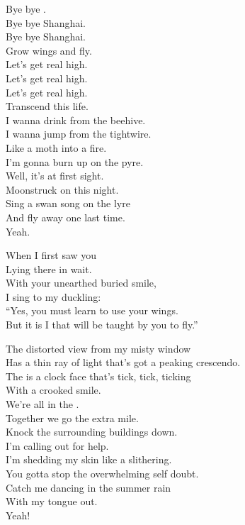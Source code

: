 



Bye bye . \\
Bye bye Shanghai. \\
Bye bye Shanghai. \\
Grow wings and fly. \\
Let's get real high. \\
Let's get real high. \\
Let's get real high. \\
Transcend this life. \\

I wanna drink from the beehive. \\
I wanna jump from the tightwire. \\
Like a moth into a fire. \\
I'm gonna burn up on the pyre. \\
Well, it's  at first sight. \\
Moonstruck on this night. \\
Sing a swan song on the lyre \\
And fly away one last time. \\
Yeah. \\


When I first saw you \\
Lying there in wait. \\
With your unearthed buried smile, \\
I sing to my duckling: \\
``Yes, you must learn to use your wings. \\
But it is I that will be taught by you to fly.'' \\


The distorted view from my misty window \\
Has a thin ray of light that's got a peaking crescendo. \\
The  is a clock face that's tick, tick, ticking \\
With a crooked smile. \\
We're all in the . \\
Together we go the extra mile. \\

Knock the surrounding buildings down. \\
I'm calling out for help. \\
I'm shedding my skin like a  slithering. \\
You gotta stop the overwhelming self doubt. \\
Catch me dancing in the summer rain \\
With my tongue out. \\
Yeah! \\
